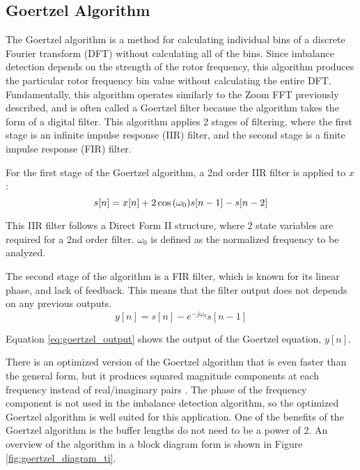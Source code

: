 \subsection{Goertzel Algorithm}
The Goertzel algorithm is a method for calculating individual bins of a discrete Fourier transform (DFT) without calculating all of the bins.  Since imbalance detection depends on the strength of the rotor frequency, this algorithm produces the particular rotor frequency bin value without calculating the entire DFT.  Fundamentally, this algorithm operates similarly to the Zoom FFT previously described, and is often called a Goertzel filter because the algorithm takes the form of a digital filter.  This algorithm applies 2 stages of filtering, where the first stage is an infinite impulse response (IIR) filter, and the second stage is a finite impulse response (FIR) filter.

For the first stage of the Goertzel algorithm, a 2nd order IIR filter is applied to $x$:
\begin{equation}
	s[n] = x[n] + 2 \cos{(\omega_0)}s[n-1] - s[n-2] \\
\end{equation}

This IIR filter follows a Direct Form II structure, where 2 state variables are required for a 2nd order filter.  $\omega_0$ is defined as the normalized frequency to be analyzed.

The second stage of the algorithm is a FIR filter, which is known for its linear phase, and lack of feedback.  This means that the filter output does not depends on any previous outputs.
\begin{equation} \label{eq:goertzel_output}
	y[n] = s[n] - e^{-j\omega_0}s[n-1]
\end{equation}

Equation \ref{eq:goertzel_output} shows the output of the Goertzel equation, $y[n]$.

There is an optimized version of the Goertzel algorithm that is even faster than the general form, but it produces squared magnitude components at each frequency instead of real/imaginary pairs \cite{embedded_goertzel}.  The phase of the frequency component is not used in the imbalance detection algorithm, so the optimized Goertzel algorithm is well suited for this application.  One of the benefits of the Goertzel algorithm is the buffer lengths do not need to be a power of 2.  An overview of the algorithm in a block diagram form is shown in Figure \ref{fig:goertzel_diagram_ti}.

